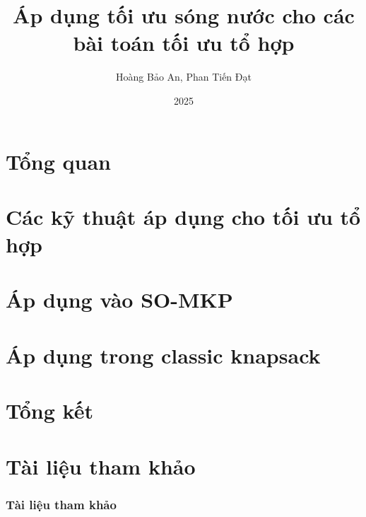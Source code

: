 \documentclass[aspectratio=169]{beamer}
\title{Áp dụng tối ưu sóng nước cho các bài toán tối ưu tổ hợp}
\author{Hoàng Bảo An, Phan Tiến Đạt}
\institute{Đại học Công Nghệ, ĐHQGHN}
\date{2025}
\begin{document}
\frame{\titlepage}

\section{Tổng quan}


\section{Các kỹ thuật áp dụng cho tối ưu tổ hợp}


\section{Áp dụng vào SO-MKP}


\section{Áp dụng trong classic knapsack}


\section{Tổng kết}



\section{Tài liệu tham khảo}
\begin{frame}[allowframebreaks]
    \frametitle{Tài liệu tham khảo}
    
    
\end{frame}
\end{document}
